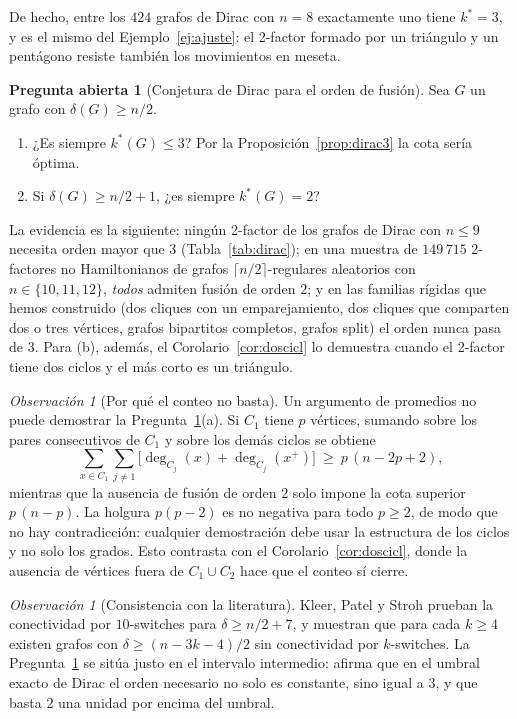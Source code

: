 \documentclass[11pt,a4paper]{article}
\theoremstyle{definition}
\newtheorem{pregunta}[teorema]{Pregunta abierta}
\theoremstyle{remark}
\newtheorem{observacion}[teorema]{Observación}
\begin{document}
De hecho, entre los $424$ grafos de Dirac con $n=8$ exactamente uno tiene $k^*=3$, y es el mismo del Ejemplo~\ref{ej:ajuste}: el 2-factor formado por un triángulo y un pentágono resiste también los movimientos en meseta.

\begin{pregunta}[Conjetura de Dirac para el orden de fusión]\label{q:dirac}
Sea $G$ un grafo con $\delta(G)\ge n/2$.
\begin{enumerate}[label=(\alph*)]
\item ¿Es siempre $k^*(G)\le3$? Por la Proposición~\ref{prop:dirac3} la cota sería óptima.
\item Si $\delta(G)\ge n/2+1$, ¿es siempre $k^*(G)=2$?
\end{enumerate}
\end{pregunta}

La evidencia es la siguiente: ningún 2-factor de los grafos de Dirac con $n\le9$ necesita orden mayor que $3$ (Tabla~\ref{tab:dirac}); en una muestra de $149\,715$ 2-factores no Hamiltonianos de grafos $\lceil n/2\rceil$-regulares aleatorios con $n\in\{10,11,12\}$, \emph{todos} admiten fusión de orden $2$; y en las familias rígidas que hemos construido (dos cliques con un emparejamiento, dos cliques que comparten dos o tres vértices, grafos bipartitos completos, grafos split) el orden nunca pasa de $3$. Para (b), además, el Corolario~\ref{cor:doscicl} lo demuestra cuando el 2-factor tiene dos ciclos y el más corto es un triángulo.


\begin{observacion}[Por qué el conteo no basta]\label{obs:conteo}
Un argumento de promedios no puede demostrar la Pregunta~\ref{q:dirac}(a). Si $C_1$ tiene $p$ vértices, sumando sobre los pares consecutivos de $C_1$ y sobre los demás ciclos se obtiene
\[
\sum_{x\in C_1}\sum_{j\neq1}\big[\deg_{C_j}(x)+\deg_{C_j}(x^+)\big]\ \ge\ p\,(n-2p+2),
\]
mientras que la ausencia de fusión de orden $2$ solo impone la cota superior $p\,(n-p)$. La holgura $p(p-2)$ es no negativa para todo $p\ge2$, de modo que no hay contradicción: cualquier demostración debe usar la estructura de los ciclos y no solo los grados. Esto contrasta con el Corolario~\ref{cor:doscicl}, donde la ausencia de vértices fuera de $C_1\cup C_2$ hace que el conteo sí cierre.
\end{observacion}

\begin{observacion}[Consistencia con la literatura]
Kleer, Patel y Stroh \cite{kps} prueban la conectividad por $10$-switches para $\delta\ge n/2+7$, y muestran que para cada $k\ge4$ existen grafos con $\delta\ge(n-3k-4)/2$ sin conectividad por $k$-switches. La Pregunta~\ref{q:dirac} se sitúa justo en el intervalo intermedio: afirma que en el umbral exacto de Dirac el orden necesario no solo es constante, sino igual a $3$, y que basta $2$ una unidad por encima del umbral.
\end{observacion}
\end{document}
